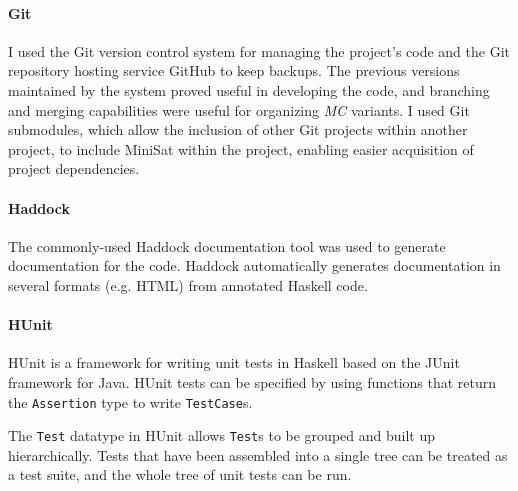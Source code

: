 \documentclass[12pt,a4paper,twoside,openright]{report}
\begin{document}
\paragraph{Git}{
I used the Git version control system \cite{git}
for managing the project's code and the Git repository
hosting service GitHub \cite{github} to
keep backups.
The previous versions maintained by the system proved useful in
developing the code, and branching and merging capabilities were
useful for organizing \emph{MC} variants.
I used Git submodules, which allow the inclusion of other Git projects within another
project, to include MiniSat within the project, enabling easier
acquisition of project dependencies.

\paragraph{Haddock}{
The commonly-used Haddock \cite{haddock} documentation tool was used to generate documentation
for the code. Haddock automatically generates documentation in
several formats (e.g. HTML) from annotated Haskell code.
}

\paragraph{HUnit}{
HUnit \cite{hunit} is a framework for writing unit tests in Haskell based on the
JUnit framework \cite{junit} for Java.
HUnit tests can be specified by using functions
that return the \verb,Assertion, type to write \verb,TestCase,s.

The \verb,Test, datatype in HUnit allows \verb,Test,s to be grouped
and built up hierarchically. Tests that have been assembled into a
single tree can be treated as a test suite, and the whole tree
of unit tests can be run.}

}
\end{document}
